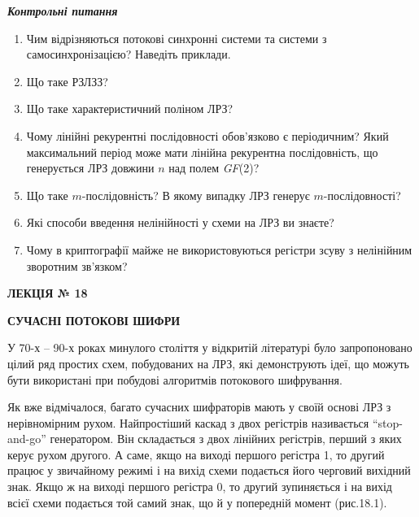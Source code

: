 \documentclass[a4paper]{article}
\newcommand\liststyleWWviiiNumlvi{%
\renewcommand\theenumi{\arabic{enumi}}
\renewcommand\theenumii{\alph{enumii}}
\renewcommand\theenumiii{\roman{enumiii}}
\renewcommand\theenumiv{\arabic{enumiv}}
\renewcommand\labelenumi{\theenumi.}
\renewcommand\labelenumii{\theenumii.}
\renewcommand\labelenumiii{\theenumiii.}
\renewcommand\labelenumiv{\theenumiv.}
}
\newcounter{}
\begin{document}
\bigskip

{\centering\bfseries\itshape
Контрольні питання
\par}


\bigskip

\liststyleWWviiiNumlvi
\begin{enumerate}
\item Чим відрізняються потокові синхронні системи та системи з
самосинхронізацією? Наведіть приклади.
\item Що таке РЗЛЗЗ?
\item Що таке характеристичний поліном ЛРЗ?
\item Чому лінійні рекурентні послідовності обов’язково є періодичним? Який
максимальний період може мати лінійна рекурентна послідовність, що генерується
ЛРЗ довжини  ${n}$ над полем \textit{GF}(2)? 
\item Що таке  ${m}${}-послідовність? В якому випадку ЛРЗ генерує 
${m}${}-послідовності?
\item Які способи введення нелінійності у схеми на ЛРЗ ви знаєте?
\item Чому в криптографії майже не використовуються регістри зсуву з нелінійним
зворотним зв’язком?
\end{enumerate}

\bigskip


\bigskip


\bigskip

{\bfseries
ЛЕКЦІЯ № 18}


\bigskip

{\centering\bfseries
СУЧАСНІ  ПОТОКОВІ  ШИФРИ
\par}


\bigskip


\bigskip

У 70-х – 90-х роках минулого століття у відкритій літературі було запропоновано
цілий ряд простих схем, побудованих на ЛРЗ, які демонструють ідеї, що можуть
бути використані при побудові алгоритмів потокового шифрування.

Як вже відмічалося, багато сучасних шифраторів мають у своїй основі ЛРЗ з
нерівномірним рухом. Найпростіший каскад з двох регістрів називається
“stop{}-and{}-go” генератором. Він складається з двох лінійних регістрів,
перший з яких керує рухом другого. А саме, якщо на виході першого регістра 1,
то другий працює у звичайному режимі і на вихід схеми подається його черговий
вихідний знак. Якщо ж на виході першого регістра 0, то другий зупиняється і на
вихід всієї схеми  подається той самий знак, що й у попередній момент
(рис.18.1).
\end{document}
